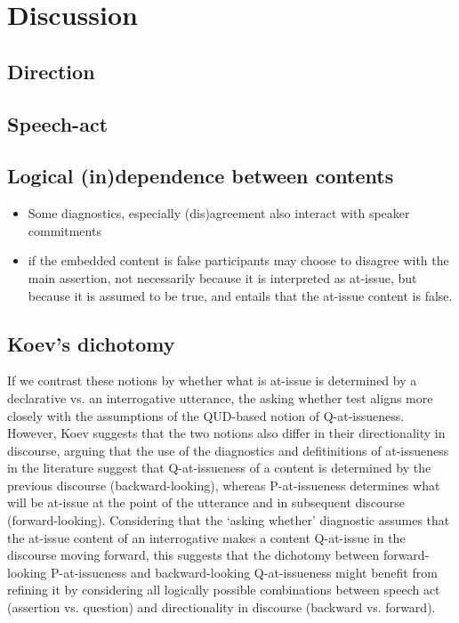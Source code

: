 \documentclass[times,linguex,xcolor]{glossa}
\begin{document}
\section{Discussion}
  \subsection{Direction}
  \subsection{Speech-act}
  \subsection{Logical (in)dependence between contents}
    \begin{itemize}
      \item Some diagnostics, especially (dis)agreement also interact with speaker commitments

      \item if the embedded content is false participants may choose to disagree with the main assertion, not necessarily because it is interpreted as at-issue, but because it is assumed to be true, and entails that the at-issue content is false.

    \end{itemize}

  \subsection{Koev's dichotomy}
    If we contrast these notions by whether what is at-issue is determined by a declarative vs. an interrogative utterance, the asking whether test aligns more closely with the assumptions of the QUD-based notion of Q-at-issueness. However, Koev suggests that the two notions also differ in their directionality in discourse, arguing that the use of the diagnostics and defitinitions of at-issueness in the literature suggest that Q-at-issueness of a content is determined by the previous discourse (backward-looking), whereas P-at-issueness determines what will be at-issue at the point of the utterance and in subsequent discourse (forward-looking). Considering that the `asking whether' diagnostic assumes that the at-issue content of an interrogative makes a content Q-at-issue in the discourse moving forward, this suggests that the dichotomy between forward-looking P-at-issueness and backward-looking Q-at-issueness might benefit from refining it by considering all logically possible combinations between speech act (assertion vs. question) and directionality in discourse (backward vs. forward).

\nocite{*} %

\end{document}
